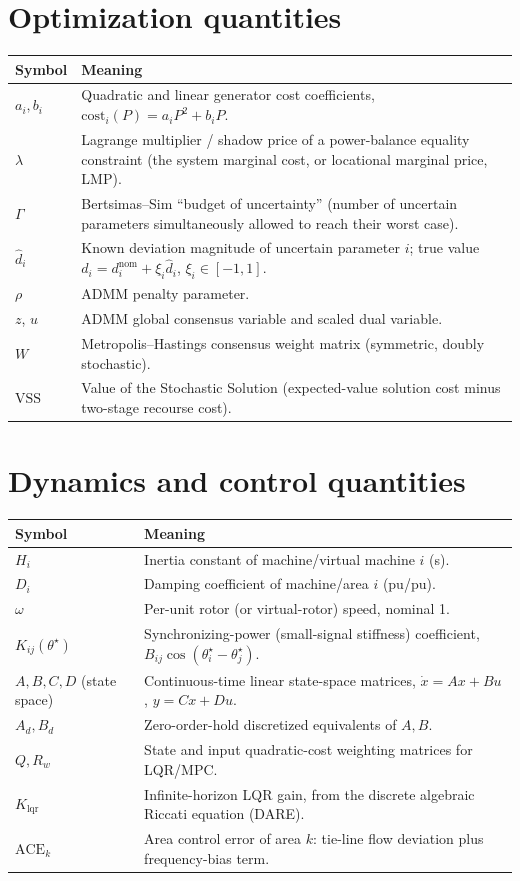 \documentclass[11pt]{report}
\theoremstyle{plain}
\theoremstyle{definition}
\theoremstyle{remark}
\begin{document}
\section{Optimization quantities}
\begin{longtable}{@{}p{3cm}p{11.5cm}@{}}
\toprule
Symbol & Meaning \\
\midrule
\endhead
$a_i, b_i$ & Quadratic and linear generator cost coefficients, $\text{cost}_i(P)=a_iP^2+b_iP$. \\
$\lambda$ & Lagrange multiplier / shadow price of a power-balance equality constraint (the system marginal cost, or locational marginal price, LMP). \\
$\Gamma$ & Bertsimas--Sim ``budget of uncertainty'' (number of uncertain parameters simultaneously allowed to reach their worst case). \\
$\hat{d}_i$ & Known deviation magnitude of uncertain parameter $i$; true value $d_i=d_i^{\text{nom}}+\xi_i\hat d_i$, $\xi_i\in[-1,1]$. \\
$\rho$ & ADMM penalty parameter. \\
$z$, $u$ & ADMM global consensus variable and scaled dual variable. \\
$W$ & Metropolis--Hastings consensus weight matrix (symmetric, doubly stochastic). \\
$\text{VSS}$ & Value of the Stochastic Solution (expected-value solution cost minus two-stage recourse cost). \\
\bottomrule
\end{longtable}

\section{Dynamics and control quantities}
\begin{longtable}{@{}p{3cm}p{11.5cm}@{}}
\toprule
Symbol & Meaning \\
\midrule
\endhead
$H_i$ & Inertia constant of machine/virtual machine $i$ (s). \\
$D_i$ & Damping coefficient of machine/area $i$ (pu/pu). \\
$\omega$ & Per-unit rotor (or virtual-rotor) speed, nominal 1. \\
$K_{ij}(\theta^\star)$ & Synchronizing-power (small-signal stiffness) coefficient, $B_{ij}\cos(\theta_i^\star-\theta_j^\star)$. \\
$A,B,C,D$ (state space) & Continuous-time linear state-space matrices, $\dot x = Ax+Bu$, $y=Cx+Du$. \\
$A_d, B_d$ & Zero-order-hold discretized equivalents of $A, B$. \\
$Q,R_w$ & State and input quadratic-cost weighting matrices for LQR/MPC. \\
$K_{\text{lqr}}$ & Infinite-horizon LQR gain, from the discrete algebraic Riccati equation (DARE). \\
$\text{ACE}_k$ & Area control error of area $k$: tie-line flow deviation plus frequency-bias term. \\
\bottomrule
\end{longtable}
\end{document}
